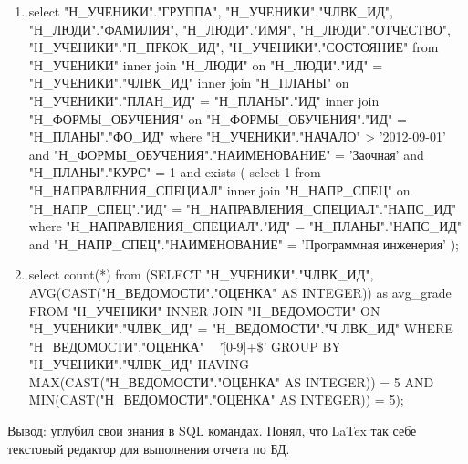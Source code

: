 \begin{enumerate}
	
	\item select "Н\_УЧЕНИКИ"."ГРУППА",
	"Н\_УЧЕНИКИ"."ЧЛВК\_ИД",
	"Н\_ЛЮДИ"."ФАМИЛИЯ",
	"Н\_ЛЮДИ"."ИМЯ",
	"Н\_ЛЮДИ"."ОТЧЕСТВО",
	"Н\_УЧЕНИКИ"."П\_ПРКОК\_ИД",
	"Н\_УЧЕНИКИ"."СОСТОЯНИЕ"
	from "Н\_УЧЕНИКИ"
	inner join "Н\_ЛЮДИ"
	on "Н\_ЛЮДИ"."ИД" = "Н\_УЧЕНИКИ"."ЧЛВК\_ИД"
	inner join "Н\_ПЛАНЫ"
	on "Н\_УЧЕНИКИ"."ПЛАН\_ИД" = "Н\_ПЛАНЫ"."ИД"
	inner join "Н\_ФОРМЫ\_ОБУЧЕНИЯ"
	on "Н\_ФОРМЫ\_ОБУЧЕНИЯ"."ИД" = "Н\_ПЛАНЫ"."ФО\_ИД"
	where "Н\_УЧЕНИКИ"."НАЧАЛО" > '2012-09-01'
	and "Н\_ФОРМЫ\_ОБУЧЕНИЯ"."НАИМЕНОВАНИЕ" = 'Заочная'
	and "Н\_ПЛАНЫ"."КУРС" = 1
	and exists (
	select 1
	from "Н\_НАПРАВЛЕНИЯ\_СПЕЦИАЛ"
	inner join "Н\_НАПР\_СПЕЦ"
	on "Н\_НАПР\_СПЕЦ"."ИД" = "Н\_НАПРАВЛЕНИЯ\_СПЕЦИАЛ"."НАПС\_ИД"
	where "Н\_НАПРАВЛЕНИЯ\_СПЕЦИАЛ"."ИД" = "Н\_ПЛАНЫ"."НАПС\_ИД"
	and "Н\_НАПР\_СПЕЦ"."НАИМЕНОВАНИЕ" = 'Программная инженерия'
	);
	
	
	
	\item select count(*) from (SELECT
	"Н\_УЧЕНИКИ"."ЧЛВК\_ИД",
	AVG(CAST("Н\_ВЕДОМОСТИ"."ОЦЕНКА" AS INTEGER)) as avg\_grade
	FROM "Н\_УЧЕНИКИ"
	INNER JOIN "Н\_ВЕДОМОСТИ" ON "Н\_УЧЕНИКИ"."ЧЛВК\_ИД" = "Н\_ВЕДОМОСТИ"."Ч
	ЛВК\_ИД"
	WHERE "Н\_ВЕДОМОСТИ"."ОЦЕНКА" ~ '\^[0-9]+\$'
	GROUP BY "Н\_УЧЕНИКИ"."ЧЛВК\_ИД"
	HAVING
	MAX(CAST("Н\_ВЕДОМОСТИ"."ОЦЕНКА" AS INTEGER)) = 5
	AND MIN(CAST("Н\_ВЕДОМОСТИ"."ОЦЕНКА" AS INTEGER)) = 5);
\end{enumerate}

Вывод: углубил свои знания в SQL командах. Понял, что LaTex  так себе текстовый редактор для выполнения отчета по БД.